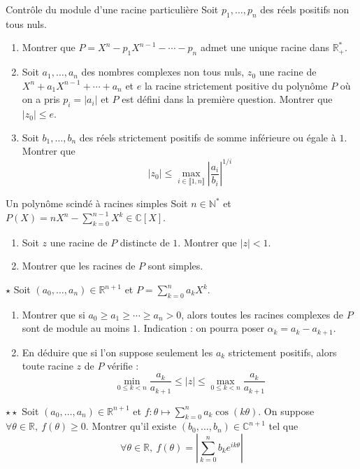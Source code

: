 \documentclass[french,a4paper]{article}
\newcommand{\N}{\mathbb{N}}
\newcommand{\R}{\mathbb{R}}
\newcommand{\C}{\mathbb{C}}
\newcommand{\st}{^*}
\theoremstyle{plain}
\theoremstyle{definition}
\theoremstyle{remark}
\begin{document}
\begin{ex}[Moulin.21]{Contrôle du module d'une racine particulière}
	Soit $p_1,\ldots,p_n$ des réels positifs non tous nuls.
	\begin{enumerate}
		\item Montrer que $P=X^n-p_1X^{n-1}-\cdots-p_n$ admet une unique racine dans $\R_+\st$.
		\item Soit $a_1,\ldots,a_n$ des nombres complexes non tous nuls, $z_0$ une racine de $X^n+a_1X^{n-1}+\cdots+a_n$ et $e$ la racine strictement positive du polynôme $P$ où on a pris $p_i=\lvert a_i\rvert$ et $P$ est défini dans la première question. Montrer que $\lvert z_0\rvert\leqslant e$.
		\item Soit $b_1,\ldots,b_n$ des réels strictement positifs de somme inférieure ou égale à $1$. Montrer que $$\lvert z_0\rvert\leqslant\max_{i\in\llbracket1,n\rrbracket}\left\lvert\frac{a_i}{b_i}\right\rvert^{1/i}$$
	\end{enumerate}
\end{ex}

\begin{ex}[Moulin.22]{Un polynôme scindé à racines simples}
	Soit $n\in\N\st$ et $P(X)=nX^n-\sum_{k=0}^{n-1}X^k\in\C[X]$.
	\begin{enumerate}
		\item Soit $z$ une racine de $P$ distincte de $1$. Montrer que $\lvert z\rvert <1$.
		\item Montrer que les racines de $P$ sont simples.
	\end{enumerate}
\end{ex}

\begin{ex}[Moulin.23]{$\star$}
	Soit $(a_0,\ldots,a_n)\in\R^{n+1}$ et $P=\displaystyle\sum_{k=0}^{n}a_kX^k$.
	\begin{enumerate}
		\item Montrer que si $a_0\geqslant a_1\geqslant\cdots\geqslant a_n>0$, alors toutes les racines complexes de $P$ sont de module au moins $1$. Indication : on pourra poser $\alpha_k=a_k-a_{k+1}$.
		\item En déduire que si l'on suppose seulement les $a_k$ strictement positifs, alors toute racine $z$ de $P$ vérifie : $$\min_{0\leqslant k<n}\frac{a_k}{a_{k+1}}\leqslant \lvert z\rvert\leqslant\max_{0\leqslant k<n}\frac{a_k}{a_{k+1}}$$
	\end{enumerate}
\end{ex}

\begin{ex}[Moulin.24]{$\star\star$}
	Soit $(a_0,\ldots,a_n)\in\R^{n+1}$ et $f:\theta\mapsto\displaystyle\sum_{k=0}^{n}a_k\cos(k\theta)$. On suppose $\forall\theta\in\R,\ f(\theta)\geqslant0$. Montrer qu'il existe $(b_0,\ldots,b_n)\in\C^{n+1}$ tel que $$\forall\theta\in\R,\ f(\theta)=\left\lvert\sum_{k=0}^{n}b_ke^{ik\theta}\right\rvert$$
\end{ex}
\end{document}
